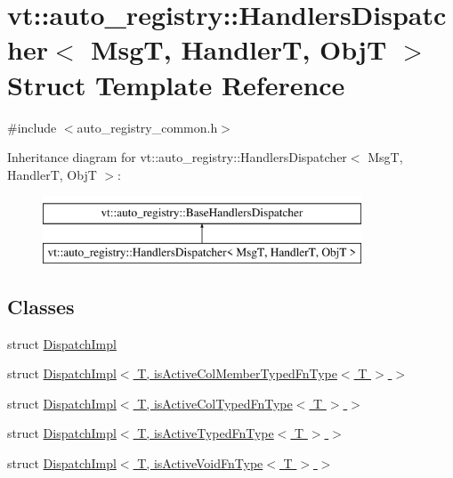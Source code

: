 \hypertarget{structvt_1_1auto__registry_1_1_handlers_dispatcher}{}\section{vt\+:\+:auto\+\_\+registry\+:\+:Handlers\+Dispatcher$<$ MsgT, HandlerT, ObjT $>$ Struct Template Reference}
\label{structvt_1_1auto__registry_1_1_handlers_dispatcher}


{\ttfamily \#include $<$auto\+\_\+registry\+\_\+common.\+h$>$}

Inheritance diagram for vt\+:\+:auto\+\_\+registry\+:\+:Handlers\+Dispatcher$<$ MsgT, HandlerT, ObjT $>$\+:\begin{figure}[H]
\begin{center}
\leavevmode
\includegraphics[height=2.000000cm]{structvt_1_1auto__registry_1_1_handlers_dispatcher}
\end{center}
\end{figure}
\subsection*{Classes}
\begin{DoxyCompactItemize}
\item 
struct \hyperlink{structvt_1_1auto__registry_1_1_handlers_dispatcher_1_1_dispatch_impl}{Dispatch\+Impl}
\item 
struct \hyperlink{structvt_1_1auto__registry_1_1_handlers_dispatcher_1_1_dispatch_impl_3_01_t_00_01is_active_col_mca715dc837e42086a4d620b73af1e2d9}{Dispatch\+Impl$<$ T, is\+Active\+Col\+Member\+Typed\+Fn\+Type$<$ T $>$ $>$}
\item 
struct \hyperlink{structvt_1_1auto__registry_1_1_handlers_dispatcher_1_1_dispatch_impl_3_01_t_00_01is_active_col_typed_fn_type_3_01_t_01_4_01_4}{Dispatch\+Impl$<$ T, is\+Active\+Col\+Typed\+Fn\+Type$<$ T $>$ $>$}
\item 
struct \hyperlink{structvt_1_1auto__registry_1_1_handlers_dispatcher_1_1_dispatch_impl_3_01_t_00_01is_active_typed_fn_type_3_01_t_01_4_01_4}{Dispatch\+Impl$<$ T, is\+Active\+Typed\+Fn\+Type$<$ T $>$ $>$}
\item 
struct \hyperlink{structvt_1_1auto__registry_1_1_handlers_dispatcher_1_1_dispatch_impl_3_01_t_00_01is_active_void_fn_type_3_01_t_01_4_01_4}{Dispatch\+Impl$<$ T, is\+Active\+Void\+Fn\+Type$<$ T $>$ $>$}
\end{DoxyCompactItemize}
